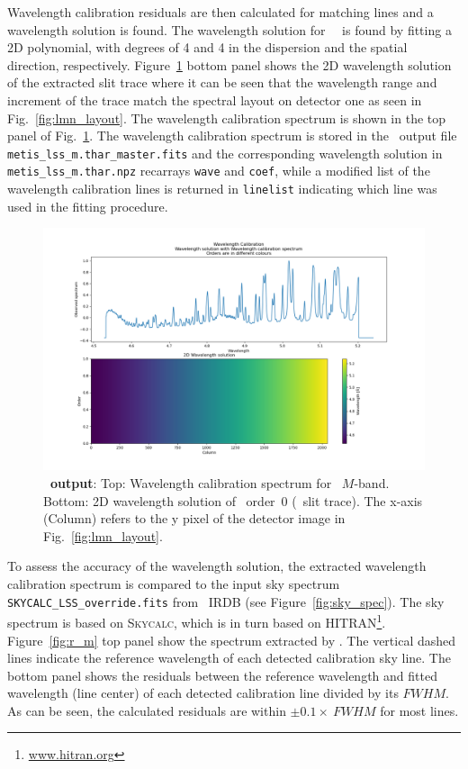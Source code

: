 Wavelength calibration residuals are then calculated for matching lines and a wavelength solution  is found. The wavelength solution for \met~\lss~is found by fitting a 2D polynomial, with degrees of 4 and 4 in the dispersion and the spatial direction, respectively. Figure~\ref{fig:fig12} bottom panel shows the 2D wavelength solution of the extracted slit trace where it can be seen that the wavelength range and increment of the trace match the spectral layout on detector one as seen in Fig.~\ref{fig:lmn_layout}.  The wavelength calibration spectrum is shown in the top panel of Fig.~\ref{fig:fig12}. The wavelength calibration spectrum is stored in the \pyred~output file \texttt{metis\_lss\_m.thar\_master.fits} and the corresponding wavelength solution in \texttt{metis\_lss\_m.thar.npz} recarrays \texttt{wave} and \texttt{coef}, while a modified list of the wavelength calibration lines is returned  in \texttt{linelist} indicating which line was used in the fitting procedure. 

\begin{figure}[!h]
  \centering
  \includegraphics[width=\textwidth]{figures/LSS_CrtAlg_files/Figure_15.png}
  \caption{\textbf{\pyred~output}: Top: Wavelength calibration spectrum for  \lss~$M$-band. Bottom: 2D wavelength solution of \pyred~order~0 (\lss~slit trace). The x-axis (Column) refers to the y pixel of the detector image in Fig.~\ref{fig:lmn_layout}. }
  \label{fig:fig12}
\end{figure}



To assess the accuracy of the wavelength solution, the extracted wavelength calibration spectrum is compared to the input sky spectrum \texttt{SKYCALC\_LSS\_override.fits} from \met~IRDB (see Figure~\ref{fig:sky_spec}). The sky spectrum is based on \textsc{Skycalc}, which is in turn based on \textsc{HITRAN}\footnote{\url{www.hitran.org}}. Figure~\ref{fig:r_m} top panel show the spectrum extracted by \pyred. The vertical dashed lines indicate the reference wavelength of each detected calibration sky line. The bottom panel shows the residuals between the reference wavelength and fitted wavelength (line center) of each detected calibration line divided by its $FWHM$. As can be seen, the calculated residuals are within $\pm 0.1 \times~FWHM$ for most lines.

